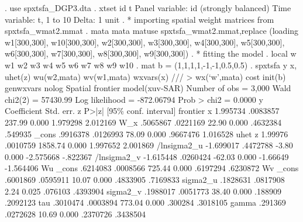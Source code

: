 . use spxtsfa_DGP3.dta
{\smallskip}
. xtset id t 
{\smallskip}
Panel variable: id (strongly balanced)
 Time variable: t, 1 to 10
         Delta: 1 unit
{\smallskip}
. * importing spatial weight matrices from spxtsfa_wmat2.mmat
. mata mata matuse spxtsfa_wmat2.mmat,replace
(loading w1[300,300], w10[300,300], w2[300,300], w3[300,300], w4[300,300], w5[300,300], w6[300,300], w7[300,300],
 w8[300,300], w9[300,300])
{\smallskip}
. * fitting the model
. local w w1 w2 w3 w4 w5 w6 w7 w8 w9 w10
{\smallskip}
. mat b = (1,1,1,1,-1,-1,0.5,0.5)
{\smallskip}
. spxtsfa y x, uhet(z) wu(w2,mata) wv(w1,mata) wxvars(x) ///
>              wx(`w',mata) cost init(b) genwxvars nolog
{\smallskip}
Spatial frontier model(xuv-SAR)                       Number of obs =    3,000
                                                      Wald chi2(2)  = 57430.99
Log likelihood = -872.06794                           Prob > chi2   =   0.0000
{\smallskip}
           y {\VBAR} Coefficient  Std. err.      z    P>|z|     [95\% conf. interval]
frontier     {\VBAR}
           x {\VBAR}   1.995734   .0083857   237.99   0.000     1.979298    2.012169
         W_x {\VBAR}   .5065867   .0221169    22.90   0.000     .4632384     .549935
       _cons {\VBAR}   .9916378   .0126993    78.09   0.000     .9667476    1.016528
uhet         {\VBAR}
           z {\VBAR}    1.99976   .0010759  1858.74   0.000     1.997652    2.001869
 /lnsigma2_u {\VBAR}  -1.699017   .4472788    -3.80   0.000    -2.575668    -.822367
 /lnsigma2_v {\VBAR}  -1.615448   .0260424   -62.03   0.000     -1.66649   -1.564406
Wu           {\VBAR}
       _cons {\VBAR}   .6214083   .0008566   725.44   0.000     .6197294    .6230872
Wv           {\VBAR}
       _cons {\VBAR}   .6001869   .0595911    10.07   0.000     .4833905    .7169833
    sigma2_u {\VBAR}   .1828631   .0817908     2.24   0.025      .076103    .4393904
    sigma2_v {\VBAR}   .1988017   .0051773    38.40   0.000      .188909    .2092123
         tau {\VBAR}   .3010474   .0003894   773.04   0.000      .300284    .3018105
       gamma {\VBAR}    .291369   .0272628    10.69   0.000     .2370726    .3438504
